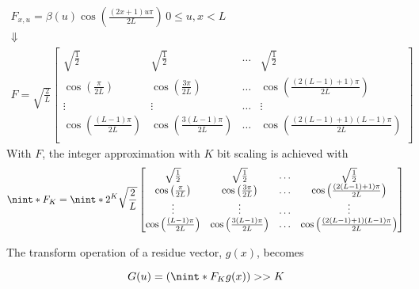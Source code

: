 \begin{equation} \label{eq:matscale}
    \begin{gathered}
        F_{x,u} = \beta(u)\cos\left(\frac{(2x+1)u\pi }{2L}\right)\,0\leq u,x < L \\
        \Downarrow \\
        F           = \sqrt{\frac{2}{L}}  \begin{bmatrix}
            \sqrt{\frac{1}{2}}                                  & \sqrt{\frac{1}{2}}                                & \dots & \sqrt{\frac{1}{2}} \\
            \cos\left(\frac{\pi}{2L}\right)    & \cos\left(\frac{3\pi}{2L}\right) & \dots & \cos\left(\frac{(2(L-1)+1)\pi}{2L}\right) \\
            \vdots     & \vdots     & \dots & \vdots       \\
            \cos\left(\frac{(L-1)\pi}{2L}\right)    & \cos\left(\frac{3(L-1)\pi}{2L}\right) & \dots & \cos\left(\frac{(2(L-1)+1)(L-1)\pi}{2L}\right) \\
        \end{bmatrix} 
    \end{gathered}
\end{equation}
With $F$, the integer approximation with $K$ bit scaling is achieved with 
\begin{equation} \label{eq:matscale}
    \nint*{F_K}   = \nint*{2^K \sqrt{\frac{2}{L}}    \begin{bmatrix}
                                        \sqrt{\frac{1}{2}}                                  & \sqrt{\frac{1}{2}}                                & \dots & \sqrt{\frac{1}{2}} \\
                                        \cos\left(\frac{\pi}{2L}\right)    & \cos\left(\frac{3\pi}{2L}\right) & \dots & \cos\left(\frac{(2(L-1)+1)\pi}{2L}\right) \\
                                        \vdots     & \vdots     & \dots & \vdots       \\
                                        \cos\left(\frac{(L-1)\pi}{2L}\right)    & \cos\left(\frac{3(L-1)\pi}{2L}\right) & \dots & \cos\left(\frac{(2(L-1)+1)(L-1)\pi}{2L}\right) \\
                                \end{bmatrix} 
                }
\end{equation}

The transform operation of a residue vector, $g(x)$, becomes

\begin{equation}
    G(u) = \left(\nint*{F_K} g(x)\right)>>K
\end{equation}
